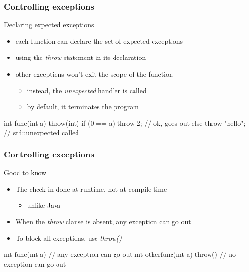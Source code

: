 \begin{frame}[fragile]
  \frametitle{Controlling exceptions}
  \begin{block}{Declaring expected exceptions}
    \begin{itemize}
    \item each function can declare the set of expected exceptions
    \item using the {\it throw} statement in its declaration
    \item other exceptions won't exit the scope of the function
      \begin{itemize}
      \item instead, the {\it unexpected} handler is called
      \item by default, it terminates the program
      \end{itemize}
    \end{itemize}
  \end{block}
  \pause
  \begin{cppcode}
    int func(int a) throw(int) {
      if (0 == a) {
        throw 2;  // ok, goes out
      } else {
        throw "hello"; // std::unexpected called
      }
    }
  \end{cppcode}
\end{frame}  

\begin{frame}[fragile]
  \frametitle{Controlling exceptions}
  \begin{block}{Good to know}
    \begin{itemize}
    \item The check in done at runtime, not at compile time
      \begin{itemize}
      \item unlike Java
      \end{itemize}
    \item When the {\it throw} clause is absent, any exception can go out
    \item To block all exceptions, use {\it throw()}
    \end{itemize}
  \end{block}
  \pause
  \begin{cppcode}
    int func(int a) {
      // any exception can go out
    }
    int otherfunc(int a) throw() {
      // no exception can go out
    }
  \end{cppcode}
\end{frame}  


